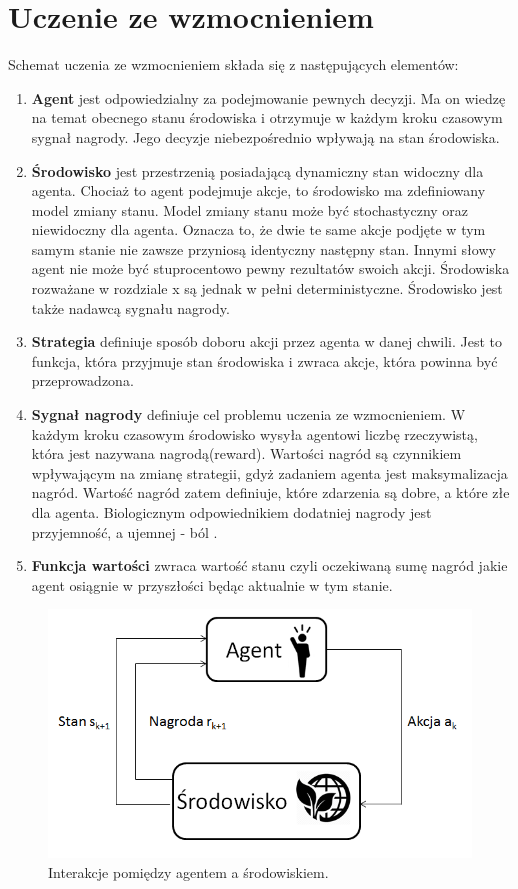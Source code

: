 \documentclass[12pt]{book}
\theoremstyle{plain}
\begin{document}
\section{Uczenie ze wzmocnieniem}
Schemat uczenia ze wzmocnieniem składa się z następujących elementów:
\begin{enumerate}
	\item \textbf{Agent} jest odpowiedzialny za podejmowanie pewnych decyzji. Ma on wiedzę na temat obecnego stanu środowiska i otrzymuje w każdym kroku czasowym sygnał nagrody. Jego decyzje niebezpośrednio wpływają na stan środowiska.
	\item \textbf{Środowisko} jest przestrzenią posiadającą dynamiczny stan widoczny dla agenta. Chociaż to agent podejmuje akcje, to środowisko ma zdefiniowany model zmiany stanu. Model zmiany stanu może być stochastyczny oraz niewidoczny dla agenta. Oznacza to, że dwie te same akcje podjęte w tym samym stanie nie zawsze przyniosą identyczny następny stan. Innymi słowy agent nie może być stuprocentowo pewny rezultatów swoich akcji. Środowiska rozważane w rozdziale x są jednak w pełni deterministyczne. Środowisko jest także nadawcą sygnału nagrody.
	\item \textbf{Strategia} definiuje sposób doboru akcji przez agenta w danej chwili. Jest to funkcja, która przyjmuje stan środowiska i zwraca akcje, która powinna być przeprowadzona. 
	\item \textbf{Sygnał nagrody} definiuje cel problemu uczenia ze wzmocnieniem. W każdym kroku czasowym środowisko wysyła agentowi liczbę rzeczywistą, która jest nazywana nagrodą(reward). Wartości nagród są czynnikiem wpływającym na zmianę strategii, gdyż zadaniem agenta jest maksymalizacja nagród. Wartość nagród zatem definiuje, które zdarzenia są dobre, a które złe dla agenta. Biologicznym odpowiednikiem dodatniej nagrody jest przyjemność, a ujemnej - ból \cite{berridge2000reward}. 
	\item \textbf{Funkcja wartości} zwraca wartość stanu czyli oczekiwaną sumę nagród jakie agent osiągnie w przyszłości będąc aktualnie w tym stanie. 
\end{enumerate}
\begin{figure}[H]
	\centering
	\includegraphics[width=14cm]{agent-srodowisko}
	\caption{Interakcje pomiędzy agentem a środowiskiem.}
	\label{fig:agent-srodowisko}
\end{figure}
\end{document}
